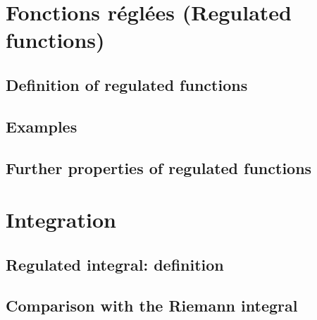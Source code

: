 \documentclass[10pt, a4paper]{article}
\begin{document}
\newpage

\section{Fonctions réglées (Regulated functions)}

\subsection{Definition of regulated functions}














































\subsection{Examples}

\subsection{Further properties of regulated functions}

\newpage

\section{Integration}

\subsection{Regulated integral: definition}

\subsection{Comparison with the Riemann integral}
\end{document}

